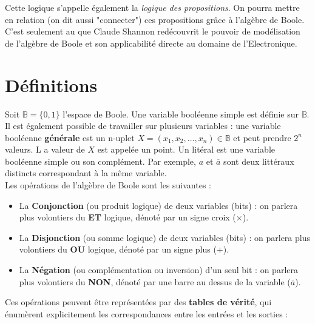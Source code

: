 Cette logique s'appelle également la {\it logique des propositions}. On pourra mettre en relation (on dit aussi "connecter") ces propositions grâce à l'algèbre de Boole.
C'est seulement au   que Claude Shannon redécouvrit le pouvoir de modélisation de l'algèbre de Boole et son applicabilité
directe au domaine de l'Electronique.

\section{Définitions}


Soit $\mathbb{B}=\{0,1\}$ l'espace de Boole. Une variable booléenne simple est définie sur $\mathbb{B}.$
Il est également possible de travailler sur plusieurs variables : une variable booléenne {\bf générale} est un n-uplet $X=(x_1,x_2,\dots,x_n) \in \mathbb{B}$ et peut prendre $2^n$ valeurs. L
a valeur de $X$ est appelée un point. Un litéral est une variable booléenne simple ou son complément. Par exemple, $a$ et $\overline{a}$ sont deux littéraux distincts correspondant à la même
 variable.\\

Les opérations de l'algèbre de Boole sont les suivantes :
\begin{itemize}
\item La {\bf Conjonction} (ou produit logique) de deux variables (bits) : on parlera plus volontiers du {\bf ET} logique, dénoté par un signe croix ($\times$).
\item La {\bf Disjonction} (ou somme logique) de deux variables (bits) : on parlera plus volontiers du {\bf OU} logique, dénoté par un signe plus ($+$).
\item La {\bf Négation} (ou complémentation ou inversion) d'un seul bit : on parlera plus volontiers du {\bf NON}, dénoté par une barre au dessus de la variable ($\bar a$).
\end{itemize}

Ces opérations peuvent être représentées par des {\bf tables de vérité}, qui énumèrent explicitement les correspondances entre les entrées et les sorties :

